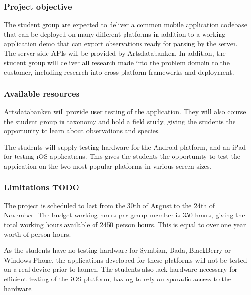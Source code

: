 \subsubsection{Project objective}
The student group are expected to deliver a common mobile application codebase
that can be deployed on many different platforms in addition to a working
application demo that can export observations ready for parsing by the server.
The server-side APIs will be provided by Artsdatabanken. In addition, the
student group will deliver all research made into the problem domain to the
customer, including research into cross-platform frameworks and deployment.

\subsubsection{Available resources}
Artsdatabanken will provide user testing of the application. They will also
course the student group in taxonomy and hold a field study, giving the
students the opportunity to learn about observations and species.

The students will supply testing hardware for the Android platform, and an iPad
for testing iOS applications. This gives the students the opportunity to test
the application on the two most popular platforms in various screen sizes.

\subsubsection{Limitations TODO}
The project is scheduled to last from the 30th of August to the 24th of
November. The budget working hours per group member is 350 hours, giving the
total working hours available of 2450 person hours. This is equal to over one
year worth of person hours. 

As the students have no testing hardware for Symbian, Bada, BlackBerry or
Windows Phone, the applications developed for these platforms will not be
tested on a real device prior to launch. The students also lack hardware
necessary for efficient testing of the iOS platform, having to rely on sporadic
access to the hardware.
